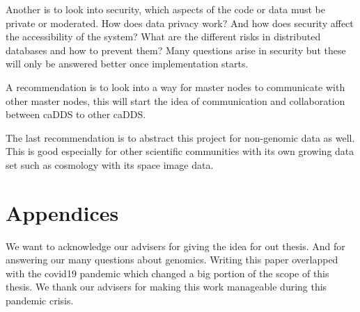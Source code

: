 \documentclass[acmsmall]{acmart}
\begin{document}
Another is to look into security, which aspects of the code or data must be private or moderated. How does data privacy work? And how does security affect the accessibility of the system? What are the different risks in distributed databases and how to prevent them? Many questions arise in security but these will only be answered better once implementation starts.

A recommendation is to look into a way for master nodes to communicate with other master nodes, this will start the idea of communication and collaboration between caDDS to other caDDS.

The last recommendation is to abstract this project for non-genomic data as well. This is good especially for other scientific communities with its own growing data set such as cosmology with its space image data. 


\section{Appendices}

\begin{acks}

We want to acknowledge our advisers for giving the idea for out thesis. And for answering our many questions about genomics. Writing this paper overlapped with the covid19 pandemic which changed a big portion of the scope of this thesis. We thank our advisers for making this work manageable during this pandemic crisis.
\end{acks}




\appendix
\end{document}
